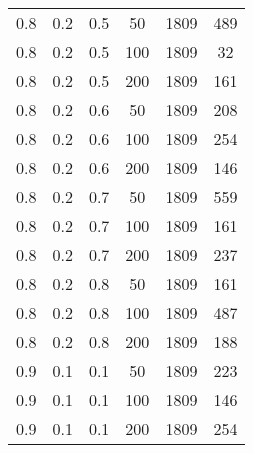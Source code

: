 \begin{table}[h]
\begin{center}
\begin{threeparttable}
\begin{tabular}{|c|c|c|c|c|c|}
	   \hline
		0.8 &  0.2 &  0.5 &   50 &  1809 &   489 \\
		0.8 &  0.2 &  0.5 &  100 &  1809 &    32 \\
		0.8 &  0.2 &  0.5 &  200 &  1809 &   161 \\
	   \hline
		0.8 &  0.2 &  0.6 &   50 &  1809 &   208 \\
		0.8 &  0.2 &  0.6 &  100 &  1809 &   254 \\
		0.8 &  0.2 &  0.6 &  200 &  1809 &   146 \\
	   \hline
		0.8 &  0.2 &  0.7 &   50 &  1809 &   559 \\
		0.8 &  0.2 &  0.7 &  100 &  1809 &   161 \\
		0.8 &  0.2 &  0.7 &  200 &  1809 &   237 \\
	   \hline
		0.8 &  0.2 &  0.8 &   50 &  1809 &   161 \\
		0.8 &  0.2 &  0.8 &  100 &  1809 &   487 \\
		0.8 &  0.2 &  0.8 &  200 &  1809 &   188 \\
	   \hline
		0.9 &  0.1 &  0.1 &   50 &  1809 &   223 \\
		0.9 &  0.1 &  0.1 &  100 &  1809 &   146 \\
		0.9 &  0.1 &  0.1 &  200 &  1809 &   254 \\
	   \hline
        		\end{tabular}
        \end{threeparttable}
	\end{center}
\end{table}
